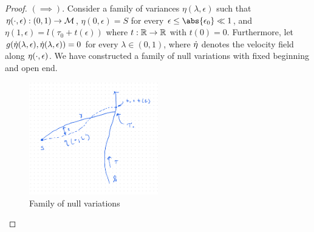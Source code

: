 \begin{proof}
$(\implies)$. Consider a family of variances $\eta(\lambda, \epsilon)$ such that $\eta(\cdot, \epsilon) : (0,1) \to \mathcal{M}$, $\eta(0, \epsilon) = S$ for every $\eps \le \abs{\eps_0} \ll 1$, and $\eta(1, \epsilon) = l(\tau_0 + t(\epsilon))$ where $t: \mathbb{R} \to \mathbb{R}$ with $t(0)=0$.
Furthermore, let $g(\dot{\eta}(\lambda, \epsilon), \dot{\eta}(\lambda, \epsilon)) = 0$ for every $\lambda \in (0,1)$, where $\dot{\eta}$ denotes the velocity field along $\eta(\cdot, \epsilon)$. We have constructed a family of null variations with fixed beginning and open end.
%
\begin{figure}[!htb]
	\centering
	\includegraphics[width=0.5\textwidth]{img/null-variations.png}
	\caption{Family of null variations}
	\label{}
\end{figure}


\end{proof}
